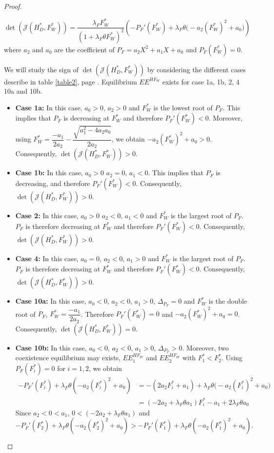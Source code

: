 \documentclass{article}
\newcommand{\lfw}{\lambda_{F}}
\newcommand{\lfw}{\lambda_{F}}
\begin{document}
\begin{proof}
\begin{itemize}
\begin{equation*}
\det(\mathcal{J}(H_D^*, F_W^*))  = \dfrac{ \lfw F_W^*}{(1 + \lfw \theta F_W^*)^2}\left( -P_F'(F_W^*) + \lfw \theta \Big(- a_2(F_W^*)^2  + a_0\Big) \right)
\end{equation*}
where $a_2$ and $a_0$ are the coefficient of $P_F = a_2 X^2 + a_1 X + a_0$ and $P_F(F_W^*) = 0$.

We will study the sign of $\det(\mathcal{J}(H_D^*, F_W^*))$ by considering the different cases describe in table \ref{table2}, page \pageref{table2}. Equilibrium $EE^{HF_W}$ exists for case 1a, 1b, 2, 4 10a and 10b.
\begin{itemize}
\item \textbf{Case 1a:} In this case, $a_0 > 0$, $a_2 > 0$ and $F_W^*$ is the lowest root of $P_F$. This implies that $P_F$ is decreasing at $F_W^*$ and therefore $P_F'(F_W^*) < 0$. Moreover, using $F_W^* = \dfrac{-a_1}{2a_2} - \dfrac{\sqrt{a_1^2 - 4 a_2 a_0}}{2a_2}$, we obtain $- a_2(F_W^*)^2  + a_0 > 0$. Consequently, $\det(\mathcal{J}(H_D^*, F_W^*)) > 0$.
\item \textbf{Case 1b:} In this case, $a_0 > 0$ $a_2 = 0$, $a_1 < 0$. This implies that $P_F$ is decreasing, and therefore $P_F'(F_W^*) < 0$. Consequently, $\det(\mathcal{J}(H_D^*, F_W^*)) > 0$.
\item \textbf{Case 2:} In this case, $a_0 > 0$ $a_2 < 0$, $a_1 < 0$ and $F_W^*$ is the largest root of $P_F$. $P_F$ is therefore decreasing at $F_W^*$ and therefore $P_F'(F_W^*) < 0$. Consequently, $\det(\mathcal{J}(H_D^*, F_W^*)) > 0$.
\item \textbf{Case 4:} In this case, $a_0 = 0$, $a_2 < 0$, $a_1 > 0$ and $F_W^*$ is the largest root of $P_F$. $P_F$ is therefore decreasing at $F_W^*$ and therefore $P_F'(F_W^*) < 0$. Consequently, $\det(\mathcal{J}(H_D^*, F_W^*)) > 0$.
\item \textbf{Case 10a:} In this case, $a_0 < 0$, $a_2 < 0$, $a_1 > 0$, $\Delta_{P_F} = 0$ and $F_W^*$ is the double root of $P_F$, $F_W^* = \dfrac{-a_1}{2 a_2}$. Therefore $P_F'(F_W^*) = 0$ and $- a_2(F_W^*)^2  + a_0 = 0$. Consequently, $\det(\mathcal{J}(H_D^*, F_W^*)) = 0$.
\item \textbf{Case 10b:} In this case, $a_0 < 0$, $a_2 < 0$, $a_1 > 0$, $\Delta_{P_F} > 0$. Moreover, two coexistence equilibrium may exists, $EE^{HF_W}_1$ and $EE^{HF_W}_2$ with $F_1^* < F_2^*$. Using $P_F(F_i^*) = 0$ for $i=1,2$, we obtain
\begin{align*}
- P_F'(F_i^*) +\lfw \theta (- a_2(F_i^*)^2  + a_0)  &= -(2a_2 F_i^* + a_1) + \lfw \theta \Big(- a_2(F_i^*)^2  + a_0\Big) \\
&= (-2a_2 + \lfw \theta a_1) F_i^* -a_1 + 2\lfw \theta a_0
 \end{align*}
Since $a_2 <0 < a_1$, $0 < (-2a_2 + \lfw \theta a_1)$ and 
\begin{equation}\label{inequalityDetF1F2}
- P_F'(F_2^*) + \lfw \theta (- a_2(F_2^*)^2  + a_0) > - P_F'(F_1^*) + \lfw \theta (- a_2(F_1^*)^2  + a_0).
\end{equation}



\end{itemize}
\end{itemize}
\end{proof}
\end{document}
